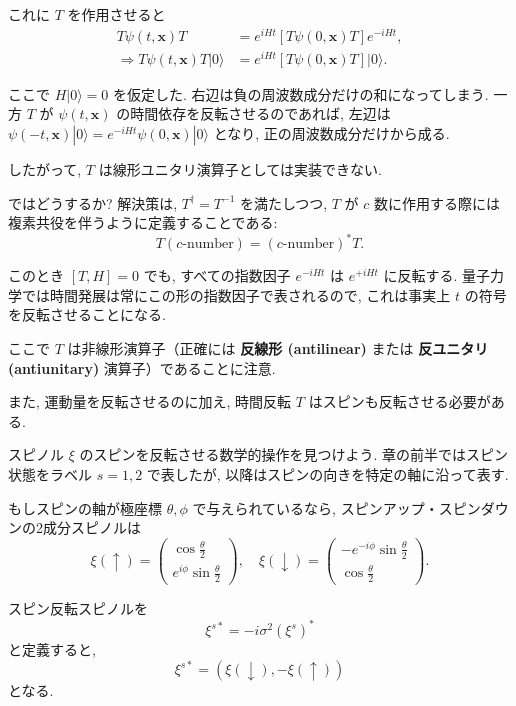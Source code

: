 \documentclass[a4paper,12pt]{article}
\begin{document}
これに $T$ を作用させると
\begin{align*}
T\psi(t,\mathbf{x})T &= e^{iHt}[T\psi(0,\mathbf{x})T] e^{-iHt}, \\
\Rightarrow T\psi(t,\mathbf{x})T|0\rangle &= e^{iHt}[T\psi(0,\mathbf{x})T]|0\rangle.
\end{align*}

ここで $H|0\rangle=0$ を仮定した.  
右辺は負の周波数成分だけの和になってしまう.  
一方 $T$ が $\psi(t,\mathbf{x})$ の時間依存を反転させるのであれば, 左辺は $\psi(-t,\mathbf{x})|0\rangle=e^{-iHt}\psi(0,\mathbf{x})|0\rangle$ となり, 正の周波数成分だけから成る.  

したがって, $T$ は線形ユニタリ演算子としては実装できない.  

ではどうするか?  
解決策は, $T^\dagger=T^{-1}$ を満たしつつ, $T$ が $c$ 数に作用する際には複素共役を伴うように定義することである:
\begin{equation}
T(c\text{-number}) = (c\text{-number})^* T.
\tag{3.133}
\end{equation}

このとき $[T,H]=0$ でも, すべての指数因子 $e^{-iHt}$ は $e^{+iHt}$ に反転する.  
量子力学では時間発展は常にこの形の指数因子で表されるので, これは事実上 $t$ の符号を反転させることになる.  

ここで $T$ は非線形演算子（正確には \textbf{反線形 (antilinear)} または \textbf{反ユニタリ (antiunitary)} 演算子）であることに注意.  

また, 運動量を反転させるのに加え, 時間反転 $T$ はスピンも反転させる必要がある.  

スピノル $\xi$ のスピンを反転させる数学的操作を見つけよう.  
章の前半ではスピン状態をラベル $s=1,2$ で表したが, 以降はスピンの向きを特定の軸に沿って表す.  

もしスピンの軸が極座標 $\theta,\phi$ で与えられているなら, スピンアップ・スピンダウンの2成分スピノルは
\begin{equation*}
\xi(\uparrow)=\begin{pmatrix}\cos \tfrac{\theta}{2} \\ e^{i\phi}\sin\tfrac{\theta}{2}\end{pmatrix}, \quad
\xi(\downarrow)=\begin{pmatrix}-e^{-i\phi}\sin\tfrac{\theta}{2} \\ \cos\tfrac{\theta}{2}\end{pmatrix}.
\end{equation*}

スピン反転スピノルを
\begin{equation}
\xi^{s*} = -i\sigma^2 (\xi^s)^*
\tag{3.134}
\end{equation}
と定義すると,
\begin{equation}
\xi^{s*}=(\xi(\downarrow),-\xi(\uparrow))
\tag{3.135}
\end{equation}
となる.  
\end{document}

